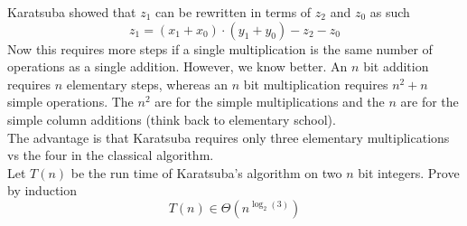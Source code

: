 \documentclass[16 pt]{amsart}
\theoremstyle{definition}
\theoremstyle{remark}
\numberwithin{equation}{subsection}
\begin{document}
Karatsuba showed that $z_1$ can be rewritten in terms of $z_2$ and $z_0$ as such
\[
z_1 = (x_1+x_0)\cdot(y_1+y_0) - z_2-z_0
\]
Now this requires more steps if a single multiplication is the same number of operations as a single addition.  However, we know better.  An $n$ bit addition requires $n$ elementary steps, whereas an $n$ bit multiplication requires $n^2 + n$ simple operations.  The $n^2$ are for the simple multiplications and the $n$ are for the simple column additions (think back to elementary school).\\

The advantage is that Karatsuba requires only three elementary multiplications vs the four in the classical algorithm.\\

Let $T(n)$ be the run time of Karatsuba's algorithm on two $n$ bit integers.  Prove by induction
\[
T(n) \in \Theta(n^{\log_2(3)})
\]
\end{document}

